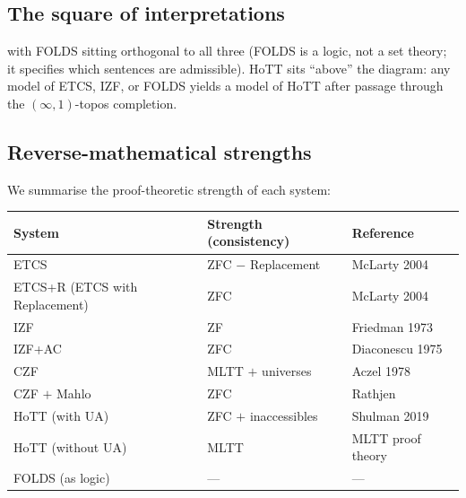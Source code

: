 \documentclass[12pt]{article}
\theoremstyle{definition}
\theoremstyle{remark}
\begin{document}
\subsection{The square of interpretations}

\begin{center}
\end{center}

with FOLDS sitting orthogonal to all three (FOLDS is a logic, not a set theory; it
specifies which sentences are admissible). HoTT sits ``above'' the diagram: any model of
ETCS, IZF, or FOLDS yields a model of HoTT after passage through the
$(\infty,1)$-topos completion.

\subsection{Reverse-mathematical strengths}

We summarise the proof-theoretic strength of each system:

\begin{center}
\begin{tabular}{lll}
\toprule
\textbf{System} & \textbf{Strength (consistency)} & \textbf{Reference} \\
\midrule
ETCS & ZFC $-$ Replacement & McLarty 2004 \\
ETCS+R (ETCS with Replacement) & ZFC & McLarty 2004 \\
IZF & ZF & Friedman 1973 \\
IZF+AC & ZFC & Diaconescu 1975 \\
CZF & MLTT $+$ universes & Aczel 1978 \\
CZF $+$ Mahlo & ZFC & Rathjen \\
HoTT (with UA) & ZFC $+$ inaccessibles & Shulman 2019 \\
HoTT (without UA) & MLTT & MLTT proof theory \\
FOLDS (as logic) & --- & --- \\
\bottomrule
\end{tabular}
\end{center}
\end{document}
